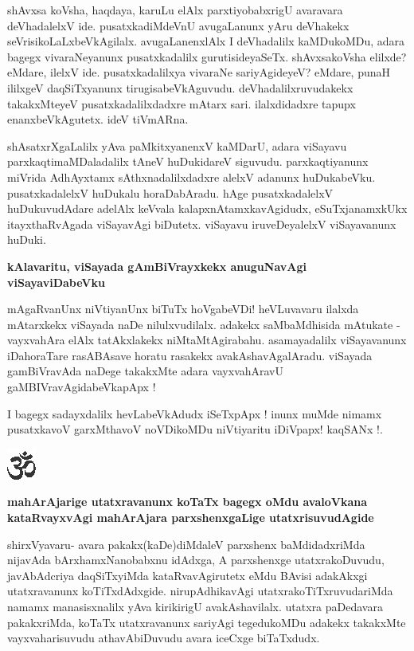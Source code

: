 shAvxsa koVsha, haqdaya, karuLu elAlx parxtiyobabxrigU avaravara deVhadalelxV ide. pusatxkadiMdeVnU avugaLanunx yAru deVhakekx seVrisikoLaLxbeVkAgilalx. avugaLanenxlAlx I deVhadalilx kaMDukoMDu, adara bagegx vivaraNeyanunx pusatxkadalilx gurutisideyaSeTx. shAvxsakoVsha elilxde? eMdare, ilelxV ide. pusatxkadalilxya vivaraNe sariyAgideyeV? eMdare, punaH ililxgeV daqSiTxyanunx tirugisabeVkAguvudu. deVhadalilxruvudakekx takakxMteyeV pusatxkadalilxdadxre mAtarx sari. ilalxdidadxre tapupx enanxbeVkAgutetx. ideV tiVmARna.

shAsatxrXgaLalilx yAva paMkitxyanenxV kaMDarU, adara viSayavu parxkaqtimaMDaladalilx tAneV huDukidareV siguvudu. parxkaqtiyanunx miVrida AdhAyxtamx sAthxnadalilxdadxre alelxV adanunx huDukabeVku. pusatxkadalelxV huDukalu horaDabAradu. hAge pusatxkadalelxV huDukuvudAdare adelAlx keVvala kalapxnAtamxkavAgidudx, eSuTxjanamxkUkx itayxthaRvAgada viSayavAgi biDutetx. viSayavu iruveDeyalelxV viSayavanunx huDuki.

{\bf kAlavaritu, viSayada gAmBiVrayxkekx anuguNavAgi viSayaviDabeVku}

mAgaRvanUnx niVtiyanUnx biTuTx hoVgabeVDi! heVLuvavaru ilalxda mAtarxkekx viSayada naDe nilulxvudilalx. adakekx saMbaMdhisida mAtukate - vayxvahAra elAlx tatAkxlakekx niMtaMtAgirabahu. asamayadalilx viSayavanunx iDahoraTare rasABAsave horatu rasakekx avakAshavAgalAradu. viSayada gamBiVravAda naDege takakxMte adara vayxvahAravU gaMBIVravAgidabeVkapApx !

I bagegx sadayxdalilx hevLabeVkAdudx iSeTxpApx ! inunx muMde nimamx pusatxkavoV garxMthavoV noVDikoMDu niVtiyaritu iDiVpapx! kaqSANx !.

\begin{center}
\includegraphics{om.eps}
\end{center}

{\bf mahArAjarige utatxravanunx koTaTx bagegx oMdu avaloVkana kataRvayxvAgi mahArAjara parxshenxgaLige utatxrisuvudAgide}

shirxVyavaru- avara pakakx(kaDe)diMdaleV parxshenx baMdidadxriMda nijavAda bArxhamxNanobabxnu idAdxga, A parxshenxge utatxrakoDuvudu, javAbAdcriya daqSiTxyiMda kataRvavAgirutetx eMdu BAvisi adakAkxgi utatxravanunx koTiTxdAdxgide. nirupAdhikavAgi utatxrakoTiTxruvudariMda namamx manasisxnalilx yAva kirikirigU avakAshavilalx. utatxra paDedavara pakakxriMda, koTaTx utatxravanunx  sariyAgi tegedukoMDu adakekx takakxMte vayxvaharisuvudu athavAbiDuvudu avara iceCxge biTaTxdudx.

